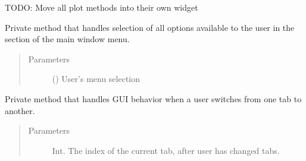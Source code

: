 \documentclass[letterpaper,10pt,english]{sphinxmanual}
\begin{document}
\begin{fulllineitems}
\begin{fulllineitems}
TODO: Move all plot methods into their own widget

\end{fulllineitems}


\begin{fulllineitems}
\label{\detokenize{polo.windows:polo.windows.main_window.MainWindow._handle_tool_menu}}
Private method that handles selection of 
all options available to the user in 
the  section of the main window menu.
\begin{quote}\begin{description}
\item[{Parameters}] \leavevmode
{} () \textendash{} User’s menu selection

\end{description}\end{quote}

\end{fulllineitems}


\begin{fulllineitems}
\label{\detokenize{polo.windows:polo.windows.main_window.MainWindow._on_changed_tab}}
Private method that handles GUI behavior when a user
switches from one tab to another.
\begin{quote}\begin{description}
\item[{Parameters}] \leavevmode
{} \textendash{} Int. The index of the current tab, after user has changed tabs.

\end{description}\end{quote}

\end{fulllineitems}



\end{fulllineitems}
\end{document}
